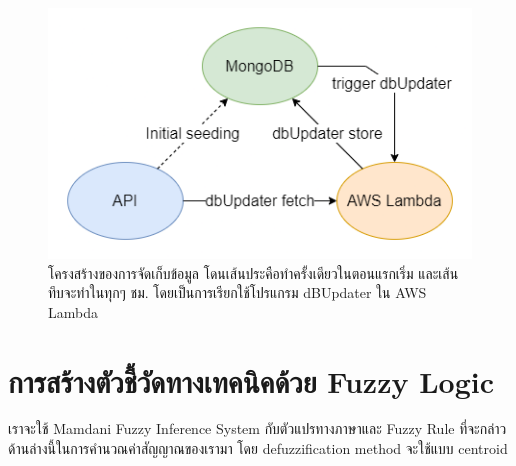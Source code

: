\begin{figure}[ht]
    \centering
    \includegraphics[scale=0.6]{images/db.png}
    \caption{โครงสร้างของการจัดเก็บข้อมูล โดนเส้นประคือทำครั้งเดียวในตอนแรกเริ่ม และเส้นทึบจะทำในทุกๆ ชม. โดยเป็นการเรียกใช้โปรแกรม dBUpdater ใน AWS Lambda}
    \label{fig:7}
\end{figure}
\FloatBarrier

\section{การสร้างตัวชี้วัดทางเทคนิคด้วย Fuzzy Logic}
เราจะใช้ Mamdani Fuzzy Inference System กับตัวแปรทางภาษาและ Fuzzy Rule ที่จะกล่าวด้านล่างนี้ในการคำนวณค่าสัญญาณของเรามา โดย defuzzification method จะใช้แบบ
centroid

